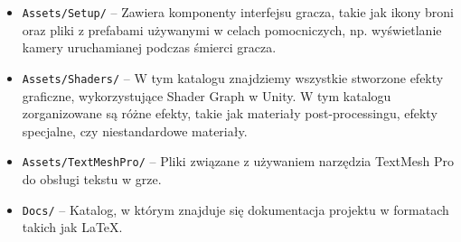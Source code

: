 \begin{itemize}
    \item \texttt{Assets/Setup/} -- Zawiera komponenty interfejsu gracza, takie jak ikony broni oraz pliki z prefabami używanymi w celach pomocniczych, np. wyświetlanie kamery uruchamianej podczas śmierci gracza.
    \item \texttt{Assets/Shaders/} -- W tym katalogu znajdziemy wszystkie stworzone efekty graficzne, wykorzystujące Shader Graph w Unity. W tym katalogu zorganizowane są różne efekty, takie jak materiały post-processingu, efekty specjalne, czy niestandardowe materiały.
    \item \texttt{Assets/TextMeshPro/} -- Pliki związane z używaniem narzędzia TextMesh Pro do obsługi tekstu w grze.
    \item \texttt{Docs/} -- Katalog, w którym znajduje się dokumentacja projektu w formatach takich jak LaTeX.
\end{itemize}

